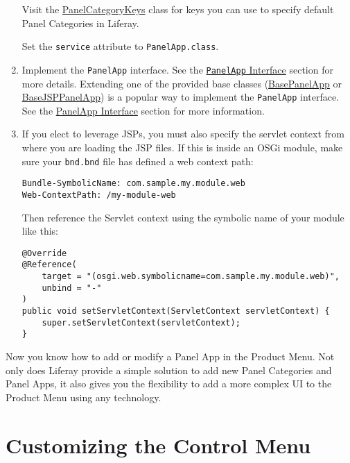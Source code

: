 \begin{enumerate}
  Visit the
  \href{https://docs.liferay.com/dxp/apps/application-list/latest/javadocs/com/liferay/application/list/constants/PanelCategoryKeys.html}{PanelCategoryKeys}
  class for keys you can use to specify default Panel Categories in
  Liferay.

  Set the \texttt{service} attribute to \texttt{PanelApp.class}.
\item
  Implement the \texttt{PanelApp} interface. See the
  \href{/docs/7-2/customization/-/knowledge_base/c/customizing-the-product-menu\#panelapp-interface}{\texttt{PanelApp}
  Interface} section for more details. Extending one of the provided
  base classes
  (\href{https://docs.liferay.com/dxp/apps/application-list/latest/javadocs/com/liferay/application/list/BasePanelApp.html}{BasePanelApp}
  or
  \href{https://docs.liferay.com/dxp/apps/application-list/latest/javadocs/com/liferay/application/list/BaseJSPPanelApp.html}{BaseJSPPanelApp})
  is a popular way to implement the \texttt{PanelApp} interface. See the
  \href{/docs/7-2/customization/-/knowledge_base/c/customizing-the-product-menu\#panelapp-interface}{PanelApp
  Interface} section for more information.
\item
  If you elect to leverage JSPs, you must also specify the servlet
  context from where you are loading the JSP files. If this is inside an
  OSGi module, make sure your \texttt{bnd.bnd} file has defined a web
  context path:

\begin{verbatim}
Bundle-SymbolicName: com.sample.my.module.web
Web-ContextPath: /my-module-web
\end{verbatim}

  Then reference the Servlet context using the symbolic name of your
  module like this:

\begin{verbatim}
@Override
@Reference(
    target = "(osgi.web.symbolicname=com.sample.my.module.web)",
    unbind = "-"
)
public void setServletContext(ServletContext servletContext) {
    super.setServletContext(servletContext);
}
\end{verbatim}
\end{enumerate}

Now you know how to add or modify a Panel App in the Product Menu. Not
only does Liferay provide a simple solution to add new Panel Categories
and Panel Apps, it also gives you the flexibility to add a more complex
UI to the Product Menu using any technology.

\chapter{Customizing the Control
Menu}\label{customizing-the-control-menu}

